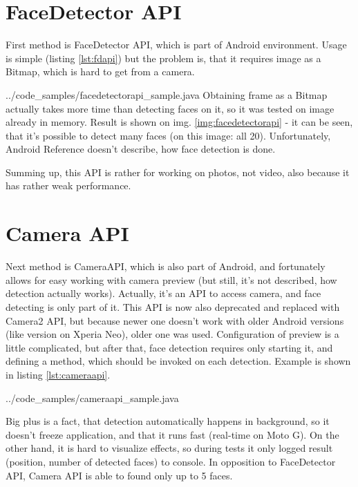 
\section{FaceDetector API}
First method is FaceDetector API, which is part of Android environment.
Usage is simple (listing \ref{lst:fdapi}) but the problem is, that it requires
image as a Bitmap, which is hard to get from a camera.

{../code_samples/facedetectorapi_sample.java}
Obtaining frame as a Bitmap actually takes more time than detecting faces on it,
so it was tested on image already in memory.
Result is shown on img. \ref{img:facedetectorapi} - it can be seen, that it's
possible to detect many faces (on this image: all 20).
Unfortunately, Android Reference \cite{android_reference} doesn't describe, how
face detection is done.

Summing up, this API is rather for working on photos, not video, also
because it has rather weak performance.


\section{Camera API}
Next method is CameraAPI, which is also part of Android, and fortunately allows
for easy working with camera preview (but still, it's not described, how
detection actually works).
Actually, it's an API to access camera, and face detecting is only part of it.
This API is now also deprecated and replaced with Camera2 API, but because newer
one doesn't work with older Android versions (like version on Xperia Neo), older
one was used. 
Configuration of preview is a little complicated, but after that,
face detection requires only starting it, and defining a method, which should be
invoked on each detection. Example is shown in listing \ref{lst:cameraapi}.

{../code_samples/cameraapi_sample.java}

Big plus is a fact, that detection automatically happens in background, so it
doesn't freeze application, and that it runs fast (real-time on Moto G).
On the other hand, it is hard to visualize effects, so during tests it only
logged result (position, number of detected faces) to console.
In opposition to FaceDetector API, Camera API is able to found only up to 5
faces.

